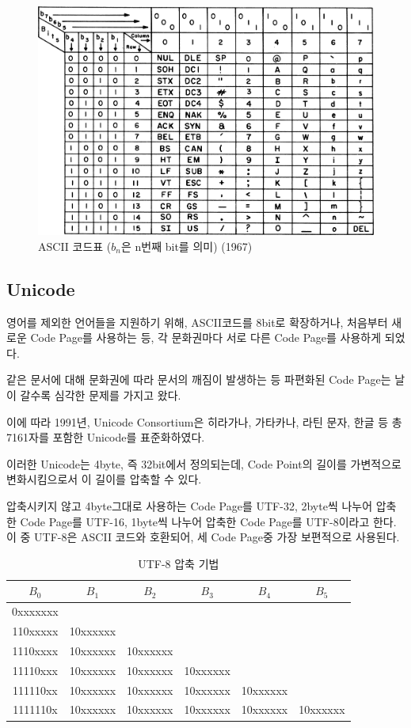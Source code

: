 \documentclass[a4paper,12pt]{book}
\begin{document}
\begin{appendices}
\begin{figure}[!h]
    \centering
    \includegraphics[width=\linewidth]{images/us-ascii.png}
    \caption{ASCII 코드표 ($b_n$은 n번째 bit를 의미) (1967)}
\end{figure}

\subsection{Unicode}

영어를 제외한 언어들을 지원하기 위해,
ASCII코드를 8bit로 확장하거나,
처음부터 새로운 Code Page를 사용하는 등,
각 문화권마다 서로 다른 Code Page를 사용하게 되었다.

같은 문서에 대해 문화권에 따라 문서의 깨짐이 발생하는 등
파편화된 Code Page는 날이 갈수록 심각한 문제를 가지고 왔다.

이에 따라 1991년, Unicode Consortium은 히라가나, 가타카나, 라틴 문자,
한글 등 총 7161자를 포함한 Unicode를 표준화하였다.

이러한 Unicode는 4byte, 즉 32bit에서 정의되는데,
Code Point의 길이를 가변적으로 변화시킴으로서 이 길이를 압축할 수 있다.

압축시키지 않고 4byte그대로 사용하는 Code Page를 UTF-32,
2byte씩 나누어 압축한 Code Page를 UTF-16,
1byte씩 나누어 압축한 Code Page를 UTF-8이라고 한다.
이 중 UTF-8은 ASCII 코드와 호환되어, 세 Code Page중 가장 보편적으로 사용된다.

\begingroup
    \centering
    \begin{longtable}{ || c | c | c | c | c | c || }
        \caption{UTF-8 압축 기법}

        \hline $B_0$ & $B_1$ & $B_2$ & $B_3$ & $B_4$ & $B_5$ \\
        \hline
        \hline 0xxxxxxx & & & & & \\
        \hline 110xxxxx & 10xxxxxx & & & & \\
        \hline 1110xxxx & 10xxxxxx & 10xxxxxx & & & \\
        \hline 11110xxx & 10xxxxxx & 10xxxxxx & 10xxxxxx & & \\
        \hline 111110xx & 10xxxxxx & 10xxxxxx & 10xxxxxx & 10xxxxxx & \\
        \hline 1111110x & 10xxxxxx & 10xxxxxx & 10xxxxxx & 10xxxxxx & 10xxxxxx \\
        \hline
    \end{longtable}
\endgroup


\end{appendices}
\end{document}
